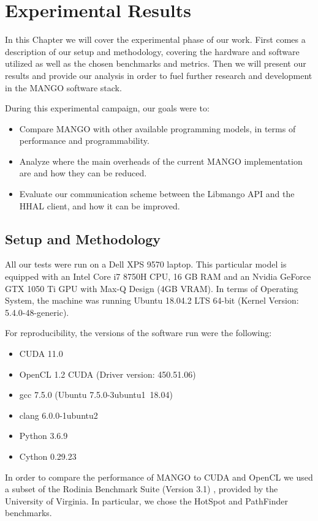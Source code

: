 \chapter{Experimental Results} \label{ch:ExperimentalResults}
In this Chapter we will cover the experimental phase of our work. First comes a description of our setup and methodology, covering the hardware and software utilized as well as the chosen benchmarks and metrics. Then we will present our results and provide our analysis in order to fuel further research and development in the MANGO software stack.

During this experimental campaign, our goals were to:
\begin{itemize}
    \item Compare MANGO with other available programming models, in terms of performance and programmability.
    \item Analyze where the main overheads of the current MANGO implementation are and how they can be reduced.
    \item Evaluate our communication scheme between the Libmango API and the HHAL client, and how it can be improved.
\end{itemize}

\section{Setup and Methodology} \label{sect:setup-methodology}
All our tests were run on a Dell XPS 9570 laptop. This particular model is equipped with an Intel Core i7 8750H CPU, 16 GB RAM and an Nvidia GeForce GTX 1050 Ti GPU with Max-Q Design (4GB VRAM). In terms of Operating System, the machine was running Ubuntu 18.04.2 LTS 64-bit (Kernel Version: 5.4.0-48-generic).

For reproducibility, the versions of the software run were the following:
\begin{itemize}
    \item CUDA 11.0
    \item OpenCL 1.2 CUDA (Driver version: 450.51.06)
    \item gcc 7.5.0 (Ubuntu 7.5.0-3ubuntu1~18.04)
    \item clang 6.0.0-1ubuntu2
    \item Python 3.6.9
    \item Cython 0.29.23
\end{itemize}

In order to compare the performance of MANGO to CUDA and OpenCL we used a subset of the Rodinia Benchmark Suite (Version 3.1) \cite{rodinia}, provided by the University of Virginia. In particular, we chose the HotSpot and PathFinder benchmarks.

